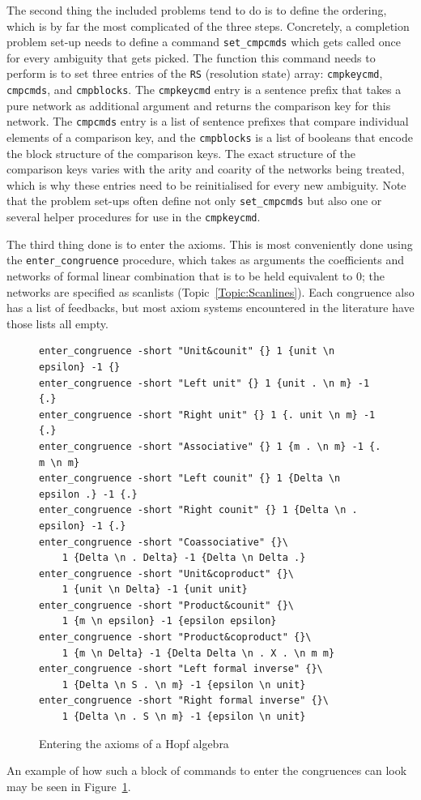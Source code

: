 \documentclass{article}
\theoremstyle{definition}
\begin{document}
The second thing the included problems tend to do is to define the 
ordering, which is by far the most complicated of the three steps. 
Concretely, a completion problem set-up needs to define a command 
\verb|set_cmpcmds| which gets called once for every ambiguity that 
gets picked. The function this command needs to perform is to set 
three entries of the \texttt{RS} (resolution state) array: 
\texttt{cmpkeycmd}, \texttt{cmpcmds}, and \texttt{cmpblocks}. The 
\texttt{cmpkeycmd} entry is a sentence prefix that takes a pure 
network as additional argument and returns the comparison key for 
this network. The \texttt{cmpcmds} entry is a list of sentence 
prefixes that compare individual elements of a comparison key, and 
the \texttt{cmpblocks} is a list of booleans that encode the block 
structure of the comparison keys. The exact structure of the 
comparison keys varies with the arity and coarity of the networks 
being treated, which is why these entries need to be reinitialised 
for every new ambiguity. Note that the problem set-ups often define 
not only \verb|set_cmpcmds| but also one or several helper procedures 
for use in the \texttt{cmpkeycmd}.

The third thing done is to enter the axioms. This is most 
conveniently done using the \verb|enter_congruence| procedure, which 
takes as arguments the coefficients and networks of formal linear 
combination that is to be held equivalent to $0$; the networks are 
specified as scanlists (Topic~\ref{Topic:Scanlines}). Each congruence 
also has a list of feedbacks, but most axiom systems encountered in 
the literature have those lists all empty.
\begin{figure}
  \small
\begin{verbatim}
enter_congruence -short "Unit&counit" {} 1 {unit \n epsilon} -1 {}
enter_congruence -short "Left unit" {} 1 {unit . \n m} -1 {.}
enter_congruence -short "Right unit" {} 1 {. unit \n m} -1 {.}
enter_congruence -short "Associative" {} 1 {m . \n m} -1 {. m \n m}
enter_congruence -short "Left counit" {} 1 {Delta \n epsilon .} -1 {.}
enter_congruence -short "Right counit" {} 1 {Delta \n . epsilon} -1 {.}
enter_congruence -short "Coassociative" {}\
    1 {Delta \n . Delta} -1 {Delta \n Delta .}
enter_congruence -short "Unit&coproduct" {}\
    1 {unit \n Delta} -1 {unit unit}
enter_congruence -short "Product&counit" {}\
    1 {m \n epsilon} -1 {epsilon epsilon}
enter_congruence -short "Product&coproduct" {}\
    1 {m \n Delta} -1 {Delta Delta \n . X . \n m m}
enter_congruence -short "Left formal inverse" {}\
    1 {Delta \n S . \n m} -1 {epsilon \n unit}
enter_congruence -short "Right formal inverse" {}\
    1 {Delta \n . S \n m} -1 {epsilon \n unit}
\end{verbatim}
  \caption{Entering the axioms of a Hopf algebra}
  \label{Fig:HopfAxioms}
\end{figure}
An example of how such a block of commands to enter the congruences 
can look may be seen in Figure~\ref{Fig:HopfAxioms}. 
\end{document}
